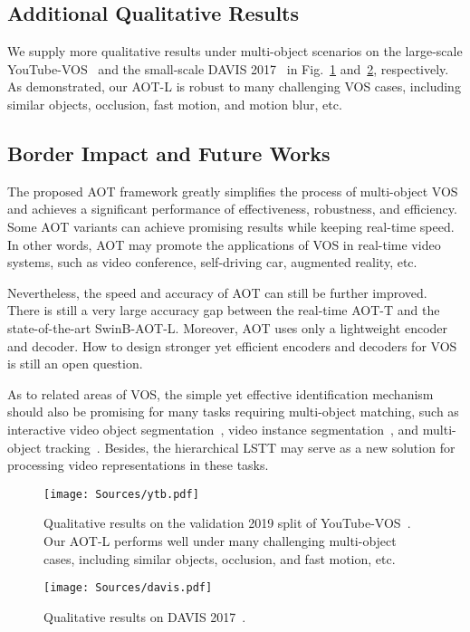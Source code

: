 \documentclass{article}
\begin{document}
\subsection{Additional Qualitative Results}
We supply more qualitative results under multi-object scenarios on the large-scale YouTube-VOS~\cite{youtubevos} and the small-scale DAVIS 2017~\cite{davis2017} in Fig.~\ref{fig:youtubevos} and~\ref{fig:davis2017}, respectively. As demonstrated, our AOT-L is robust to many challenging VOS cases, including similar objects, occlusion, fast motion, and motion blur, etc.

\subsection{Border Impact and Future Works}
The proposed AOT framework greatly simplifies the process of multi-object VOS and achieves a significant performance of effectiveness, robustness, and efficiency. Some AOT variants can achieve promising results while keeping real-time speed. In other words, AOT may promote the applications of VOS in real-time video systems, such as video conference, self-driving car, augmented reality, etc.

Nevertheless, the speed and accuracy of AOT can still be further improved. There is still a very large accuracy gap between the real-time AOT-T and the state-of-the-art SwinB-AOT-L. Moreover, AOT uses only a lightweight encoder and decoder. How to design stronger yet efficient encoders and decoders for VOS is still an open question.

As to related areas of VOS, the simple yet effective identification mechanism should also be promising for many tasks requiring multi-object matching, such as interactive video object segmentation~\cite{oh2019fast,miao2020memory}, video instance segmentation~\cite{vis,bertasius2020classifying,vist}, and multi-object tracking~\cite{milan2016mot16,pointtrack,wang2019towards}. Besides, the hierarchical LSTT may serve as a new solution for processing video representations in these tasks.


\begin{figure}[t!]
    \centering
    \texttt{[image: Sources/ytb.pdf]}

    \caption{Qualitative results on the validation 2019 split of YouTube-VOS~\cite{youtubevos}. Our AOT-L performs well under many challenging multi-object cases, including similar objects, occlusion, and fast motion, etc.}
    \label{fig:youtubevos}

\end{figure} \begin{figure}[t!]
    \centering
    \texttt{[image: Sources/davis.pdf]}

    \caption{Qualitative results on DAVIS 2017~\cite{davis2017}.}
    \label{fig:davis2017}

\end{figure}  
\end{document}
